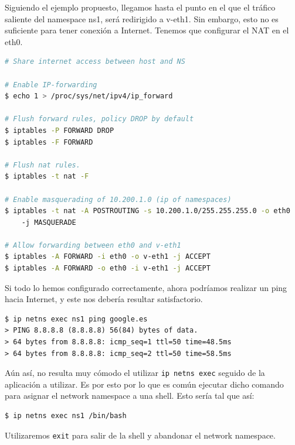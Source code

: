 \documentclass[a4paper, oneside, 12pt]{book}
\begin{document}
	
	\pagebreak

	\par \noindent Siguiendo el ejemplo propuesto, llegamos hasta el punto en el que el tráfico saliente del namespace ns1, será redirigido a v-eth1. Sin embargo, esto no es suficiente para tener conexión a Internet. Tenemos que configurar el NAT en el eth0.
	
	\begin{lstlisting}[language=bash, caption=Configuración de NAT para dar Internet a un network namespace]
# Share internet access between host and NS

# Enable IP-forwarding
$ echo 1 > /proc/sys/net/ipv4/ip_forward

# Flush forward rules, policy DROP by default
$ iptables -P FORWARD DROP
$ iptables -F FORWARD

# Flush nat rules.
$ iptables -t nat -F

# Enable masquerading of 10.200.1.0 (ip of namespaces)
$ iptables -t nat -A POSTROUTING -s 10.200.1.0/255.255.255.0 -o eth0 
	-j MASQUERADE

# Allow forwarding between eth0 and v-eth1
$ iptables -A FORWARD -i eth0 -o v-eth1 -j ACCEPT
$ iptables -A FORWARD -o eth0 -i v-eth1 -j ACCEPT
	\end{lstlisting}
	
	\addvspace{10px}
	
	\par \noindent Si todo lo hemos configurado correctamente, ahora podríamos realizar un ping hacia Internet, y este nos debería resultar satisfactorio.
	\begin{verbatim}
$ ip netns exec ns1 ping google.es
> PING 8.8.8.8 (8.8.8.8) 56(84) bytes of data.
> 64 bytes from 8.8.8.8: icmp_seq=1 ttl=50 time=48.5ms
> 64 bytes from 8.8.8.8: icmp_seq=2 ttl=50 time=58.5ms
	\end{verbatim}

	\addvspace{10px}
	
	\par \noindent Aún así, no resulta muy cómodo el utilizar \texttt{ip netns exec} seguido de la aplicación a utilizar. Es por esto por lo que es común ejecutar dicho comando para asignar el network namespace a una shell. Esto sería tal que así:
	\begin{verbatim}
$ ip netns exec ns1 /bin/bash
	\end{verbatim}
	\par \noindent Utilizaremos \texttt{exit} para salir de la shell y abandonar el network namespace.
\end{document}

